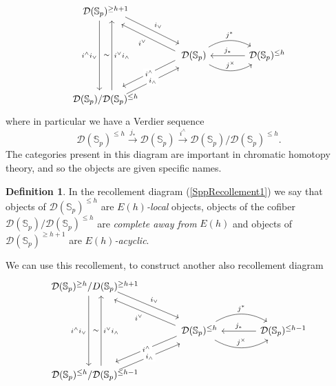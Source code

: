 \documentclass[a4paper]{article} %
\theoremstyle{definition}
\newtheorem{definition}[theorem]{Definition}
\newcommand{\toWithMapLong}[1]{\overset{#1}{\longrightarrow}}
\newcommand{\Spp}{\mathcal{D}(\mathbb{S}_p)}
\begin{document}
\begin{equation}
  \label{SppRecollement1}
  \begin{tikzcd}[sep = large]
  \Spp^{\ge h+1} \arrow[dr, shift left=1ex, "i_\vee"] \arrow[dd, shift right=1.5ex, "i^\wedge i_\vee"'] \\
  {} & \Spp  \arrow[dl,shift  right=1ex, "i^\wedge" description]  \arrow[ul, shift left=1ex, "i^\vee"]  \arrow[r, bend left, "j^*"] \arrow[r, above, bend right, "j^\times"] & \arrow{l}{}[swap]{j_*} \Spp^{\le h} \\
  \Spp/ \Spp^{\le h} \arrow[ur, shift right=1ex, "i_\wedge" description] \arrow[uu, shift right=1.5ex, "\sim", "i^\vee i_\wedge"']
  \end{tikzcd}
\end{equation}
where in particular we have a Verdier sequence
\[
\Spp^{\le h} \toWithMapLong{j_*} \Spp \toWithMapLong{i^\wedge} \Spp / \Spp^{\le h}.
\]
The categories present in this diagram are important in chromatic homotopy theory, and so the objects are given specific names.
\begin{definition}
In the recollement diagram (\ref{SppRecollement1}) we say that objects of $\Spp^{\le h}$ are $E(h)$\textit{-local} objects, objects of the cofiber $\Spp/\Spp^{\le h}$ are \textit{complete away from} $E(h)$ and objects of $\Spp^{\ge h+1}$ are $E(h)$\textit{-acyclic}. 
\end{definition}
We can use this recollement, to construct another also recollement diagram 
\begin{equation}
  \label{SppRecollement2}
    \begin{tikzcd}[sep = large]
    \Spp^{\ge h}/D(\mathbb{S}_p)^{\ge h+1} \arrow[dr, shift left=1ex, "i_\vee"] \arrow[dd, shift right=1.5ex, "i^\wedge i_\vee"'] \\
    {} & \Spp^{\le h}  \arrow[dl,shift  right=1ex, "i^\wedge" description]  \arrow[ul, shift left=1ex, "i^\vee"]  \arrow[r, bend left, "j^*"] \arrow[r, above, bend right, "j^\times"] & \arrow{l}{}[swap]{j_*} \Spp^{\le h-1} \\
    \Spp^{\le h}/\Spp^{\le h-1} \arrow[ur, shift right=1ex, "i_\wedge" description] \arrow[uu, shift right=1.5ex, "\sim", "i^\vee i_\wedge"']
    \end{tikzcd}
\end{equation}
\end{document}
